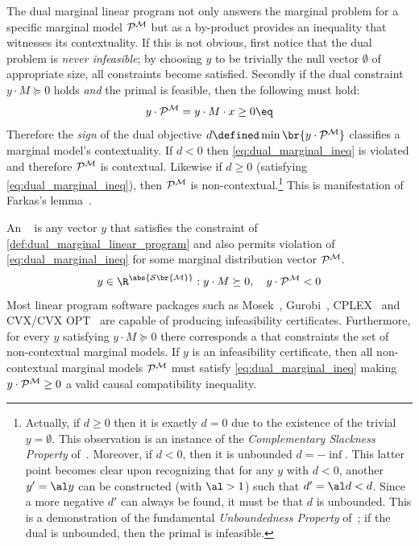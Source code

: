 \documentclass[aps, 10pt, english, twoside, pra, nofootinbib, tightenlines, longbibliography, superscriptaddress]{revtex4-1}
\renewcommand{\Events}[1]{\mathcal{S}\br{#1}} %
\begin{document}
    The dual marginal linear program not only answers the marginal problem for a specific marginal model $\probvec^{\mscenario}$ but as a by-product provides an inequality that witnesses its contextuality. If this is not obvious, first notice that the dual problem is \textit{never infeasible}; by choosing $y$ to be trivially the null vector $\emptyset$ of appropriate size, all constraints become satisfied. Secondly if the dual constraint $y \cdot M \succeq 0$ holds \textit{and} the primal is feasible, then the following must hold:
    \[ y \cdot \probvec^{\mscenario} =  y \cdot M \cdot x \geq 0 \eq \label{eq:dual_marginal_ineq} \]
    Therefore the \textit{sign} of the dual objective $d \defined \min \br{y \cdot \probvec^{\mscenario}}$ classifies a marginal model's contextuality. If $d < 0$ then \cref{eq:dual_marginal_ineq} is violated and therefore $\probvec^{\mscenario}$ is contextual. Likewise if $d \geq 0$ (satisfying \cref{eq:dual_marginal_ineq}), then $\probvec^{\mscenario}$ is non-contextual.\footnote{Actually, if $d \geq 0$ then it is exactly $d = 0$ due to the existence of the trivial $y = \emptyset$. This observation is an instance of the \textit{Complementary Slackness Property} of~\cite{Bradley_1977}. Moreover, if $d < 0$, then it is unbounded $d = -\inf$. This latter point becomes clear upon recognizing that for any $y$ with $d < 0$, another $y' = \al y$ can be constructed (with $\al > 1$) such that $d' = \al d < d$. Since a more negative $d'$ can always be found, it must be that $d$ is unbounded. This is a demonstration of the fundamental \textit{Unboundedness Property} of~\cite{Bradley_1977}; if the dual is unbounded, then the primal is infeasible.} This is manifestation of Farkas's lemma~\cite{Schrijver_1998}.

    An ~\cite{Andersen_2001} is any vector $y$ that satisfies the constraint of \cref{def:dual_marginal_linear_program} and also permits violation of \cref{eq:dual_marginal_ineq} for some marginal distribution vector $\probvec^{\mscenario}$.
    \[ y \in \R^{\abs{\Events{\mscenario}}} : y \cdot M \succeq 0, \quad y \cdot \probvec^{\mscenario} < 0 \]
    Most linear program software packages such as Mosek~\cite{Mosek_2016}, Gurobi~\cite{Gurobi_2016}, CPLEX~\cite{Cplex_2016} and CVX/CVX OPT~\cite{CVX_2016,CVX_Opt_2016} are capable of producing infeasibility certificates.
    Furthermore, for every $y$ satisfying $y \cdot M \succeq 0$ there corresponds a  that constraints the set of non-contextual marginal models. If $y$ is an infeasibility certificate, then all non-contextual marginal models $\probvec^{\mscenario}$ must satisfy \cref{eq:dual_marginal_ineq} making $y \cdot \probvec^{\mscenario} \geq 0$ a valid causal compatibility inequality.
\end{document}
